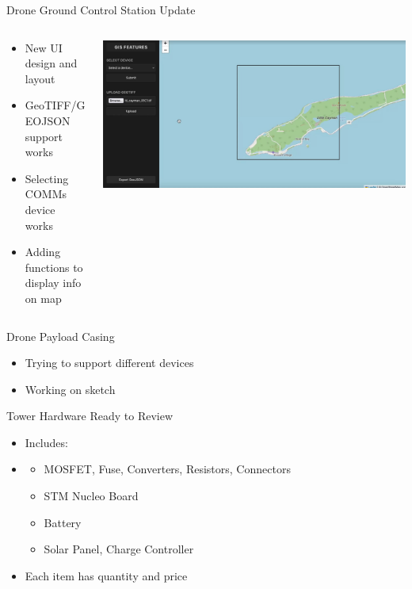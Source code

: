 \begin{frame}{Drone Ground Control Station Update}
    \begin{columns}
        \begin{column}{0.5\textwidth}
            \begin{itemize}
                \item New UI design and layout
                \item GeoTIFF/GEOJSON support works
                \item Selecting COMMs device works
                \item Adding functions to display info on map
            \end{itemize}
        \end{column}
        \begin{column}{0.5\textwidth}
            \centering
            \includegraphics[height=0.8\textheight,width=\textwidth,keepaspectratio]{images/rtt/gcs.jpg}
        \end{column}
    \end{columns}
\end{frame}

\begin{frame}{Drone Payload Casing}
    \begin{itemize}
        \item Trying to support different devices
        \item Working on sketch
    \end{itemize}    
\end{frame}

\begin{frame}{Tower Hardware Ready to Review}
    \begin{itemize}
        \item Includes:
        \item \begin{itemize}
            \item MOSFET, Fuse, Converters, Resistors, Connectors
            \item STM Nucleo Board
            \item Battery
            \item Solar Panel, Charge Controller
        \end{itemize}
        \item Each item has quantity and price
    \end{itemize}    
\end{frame}